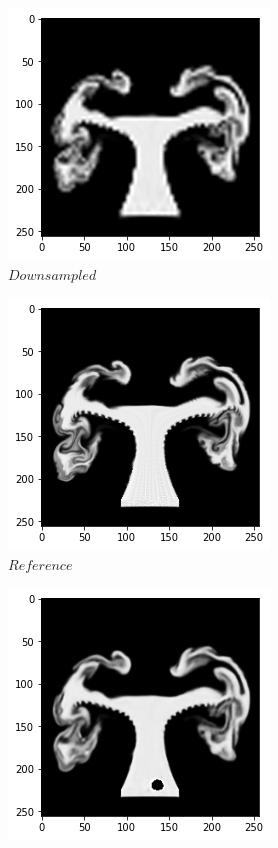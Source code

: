\documentclass[a4paper,12pt,twoside]{report}
\begin{document}
\begin{figure}
	\centering
	\begin{subfigure}{0.32\textwidth}
		\centering
		\includegraphics[scale=0.4]{superresolution/density_low.png}
		\caption{$Downsampled$}
	\end{subfigure}
	\begin{subfigure}{0.32\textwidth}
		\centering
		\includegraphics[scale=0.4]{superresolution/density_ref.png}
		\caption{$Reference$}
	\end{subfigure}
	\begin{subfigure}{0.32\textwidth}
		\centering
		\includegraphics[scale=0.4]{superresolution/density_mse.png}

\end{subfigure}
\end{figure}
\end{document}
